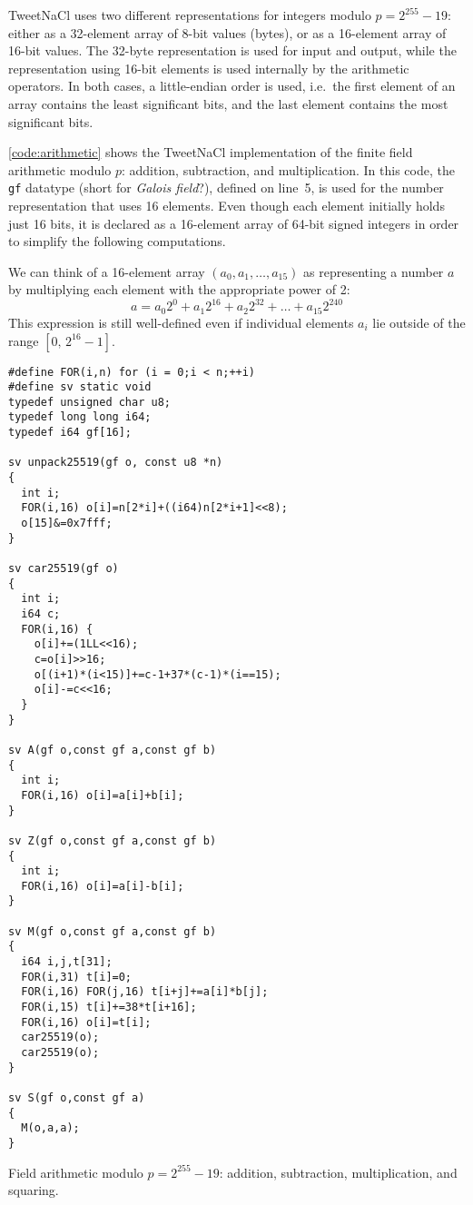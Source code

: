 \documentclass{article}
\begin{document}
TweetNaCl uses two different representations for integers modulo $p = 2^{255}-19$: either as a 32-element array of 8-bit values (bytes), or as a 16-element array of 16-bit values.
The 32-byte representation is used for input and output, while the representation using 16-bit elements is used internally by the arithmetic operators.
In both cases, a little-endian order is used, i.e.\ the first element of an array contains the least significant bits, and the last element contains the most significant bits.

\autoref{code:arithmetic} shows the TweetNaCl implementation of the finite field arithmetic modulo $p$: addition, subtraction, and multiplication.
In this code, the \verb|gf| datatype (short for \emph{Galois field}?), defined on line~5, is used for the number representation that uses 16 elements.
Even though each element initially holds just 16 bits, it is declared as a 16-element array of 64-bit signed integers in order to simplify the following computations.

We can think of a 16-element array $(a_0, a_1, \dots, a_{15})$ as representing a number $a$ by multiplying each element with the appropriate power of 2:
\[ a = a_0 2^0 + a_1 2^{16} + a_2 2^{32} + \dots + a_{15} 2^{240} \]
This expression is still well-defined even if individual elements $a_i$ lie outside of the range $[0,\, 2^{16}-1]$.

\begin{listing}
\begin{verbatim}
#define FOR(i,n) for (i = 0;i < n;++i)
#define sv static void
typedef unsigned char u8;
typedef long long i64;
typedef i64 gf[16];

sv unpack25519(gf o, const u8 *n)
{
  int i;
  FOR(i,16) o[i]=n[2*i]+((i64)n[2*i+1]<<8);
  o[15]&=0x7fff;
}

sv car25519(gf o)
{
  int i;
  i64 c;
  FOR(i,16) {
    o[i]+=(1LL<<16);
    c=o[i]>>16;
    o[(i+1)*(i<15)]+=c-1+37*(c-1)*(i==15);
    o[i]-=c<<16;
  }
}

sv A(gf o,const gf a,const gf b)
{
  int i;
  FOR(i,16) o[i]=a[i]+b[i];
}

sv Z(gf o,const gf a,const gf b)
{
  int i;
  FOR(i,16) o[i]=a[i]-b[i];
}

sv M(gf o,const gf a,const gf b)
{
  i64 i,j,t[31];
  FOR(i,31) t[i]=0;
  FOR(i,16) FOR(j,16) t[i+j]+=a[i]*b[j];
  FOR(i,15) t[i]+=38*t[i+16];
  FOR(i,16) o[i]=t[i];
  car25519(o);
  car25519(o);
}

sv S(gf o,const gf a)
{
  M(o,a,a);
}
\end{verbatim}
\caption{Field arithmetic modulo $p = 2^{255} - 19$: addition, subtraction, multiplication, and squaring.}\label{code:arithmetic}
\end{listing}
\end{document}
